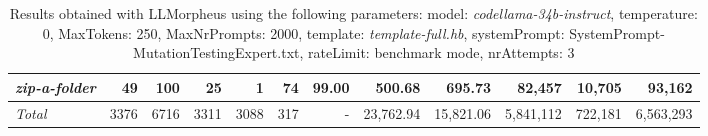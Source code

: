 \begin{table*}
{\begin{tabular}{l||r|r|r|r|r|r|r||r|r||r|r}
   \hline
   \textit{zip-a-folder} & 49 & 100 & 25 & 1 & 74 & 99.00 & 500.68 & 695.73 & 82,457 & 10,705 & 93,162 \\ 
   \hline
   \textit{Total} & 3376 & 6716 & 3311 & 3088 & 317 & - & 23,762.94  & 15,821.06 & 5,841,112 & 722,181 & 6,563,293 \\ 
 \end{tabular}
 }
 \caption{Results obtained with LLMorpheus using the following parameters: 
   model: \textit{codellama-34b-instruct}, 
   temperature: 0, 
   MaxTokens: 250, 
   MaxNrPrompts: 2000, 
   template: \textit{template-full.hb}, 
   systemPrompt: SystemPrompt-MutationTestingExpert.txt, 
   rateLimit: benchmark mode, 
   nrAttempts: 3  
 }
\end{table*}

